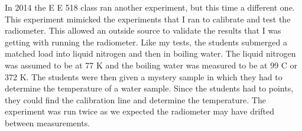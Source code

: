 In 2014 the E E 518 class ran another experiment, but this time a different one.  This experiment mimicked the experiments that I ran to calibrate and test the radiometer.  This allowed an outside source to validate the results that I was getting with running the radiometer.  Like my tests, the students submerged a matched load into liquid nitrogen and then in boiling water.  The liquid nitrogen was assumed to be at 77 K and the boiling water was measured to be at 99 C or 372 K.  The students were then given a mystery sample in which they had to determine the temperature of a water sample.  Since the students had to points, they could find the calibration line and determine the temperature.  The experiment was run twice as we expected the radiometer may have drifted between measurements.  